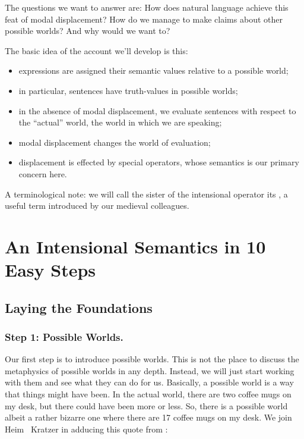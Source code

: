 The questions we want to answer are: How does natural language achieve this feat of modal displacement? How do we manage to make claims about other possible worlds? And why would we want to? 

The basic idea of the account we'll develop is this: 

\begin{itemize}
  \item expressions are assigned their semantic values relative to a possible world;
  \item in particular, sentences have truth-values in possible worlds;
  \item in the absence of modal displacement, we evaluate sentences with respect to the ``actual'' world, the world in which we are speaking;
  \item modal displacement changes the world of evaluation;
  \item displacement is effected by special operators, whose semantics is our primary concern here.
\end{itemize}
%
A terminological note: we will call the sister of the intensional operator its , a useful term introduced by our medieval colleagues.

\section{An Intensional Semantics in 10 Easy Steps} \label{sec:an-intens-semant}

\subsection{Laying the Foundations} \label{sec:laying-foundations}

\subsubsection{Step 1: Possible Worlds.} \label{sec:world-parameter}

Our first step is to introduce possible worlds. This is not the place to discuss the metaphysics of possible worlds in any depth. Instead, we will just start working with them and see what they can do for us. Basically, a possible world is a way that things might have been. In the actual world, there are two coffee mugs on my desk, but there could have been more or less. So, there is a possible world \dash albeit a rather bizarre one \dash where there are 17 coffee mugs on my desk. We join Heim \amp\ Kratzer in adducing this quote from \citet[1f.]{lewis:plurality:1986}:

